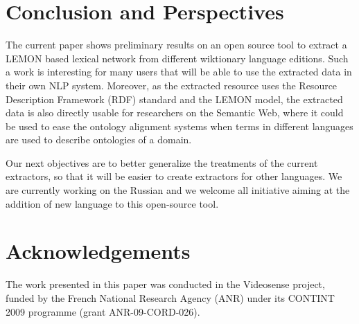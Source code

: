 \documentclass[sw]{iosart2c}
\begin{document}
\section{Conclusion and Perspectives}

The current paper shows preliminary results on an open source tool to extract a LEMON based lexical network from different wiktionary language editions. Such a work is interesting for many users that will be able to use the extracted data in their own NLP system. Moreover, as the extracted resource uses the Resource Description Framework (RDF) standard and the LEMON model, the extracted data is also directly usable for researchers on the Semantic Web, where it could be used to ease the ontology alignment systems when terms in different languages are used to describe ontologies of a domain.

Our next objectives are to better generalize the treatments of the current extractors, so that it will be easier to create extractors for other languages. We are currently working on the Russian and we welcome all initiative aiming at the addition of new language to this open-source tool.

\section{Acknowledgements}

The work presented in this paper was conducted in the Videosense project, funded by the French National Research Agency (ANR) under its CONTINT 2009 programme (grant ANR-09-CORD-026).
\end{document}
